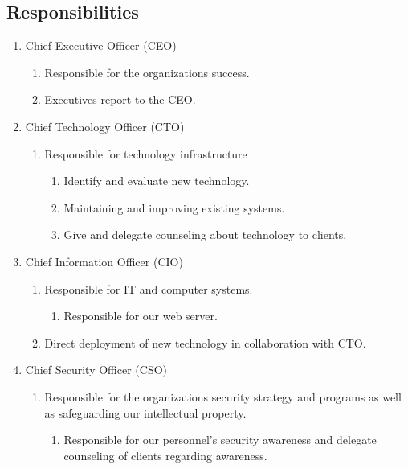 \subsection{Responsibilities}

\begin{enumerate}
  \item Chief Executive Officer (CEO)
   \begin{enumerate}
      \item Responsible for the organizations success.
      \item Executives report to the CEO.
  \end{enumerate}
  \item Chief Technology Officer (CTO)
   \begin{enumerate}
      \item Responsible for technology infrastructure
      \begin{enumerate}
        \item Identify and evaluate new technology.
        \item Maintaining and improving existing systems.
        \item Give and delegate counseling about technology to clients.
      \end{enumerate}
  \end{enumerate}
  \item Chief Information Officer (CIO)
   \begin{enumerate}
      \item Responsible for IT and computer systems.
      \begin{enumerate}
          \item Responsible for our web server.
      \end{enumerate}
      \item Direct deployment of new technology in collaboration with CTO.
  \end{enumerate}
  \item Chief Security Officer (CSO)
   \begin{enumerate}
      \item Responsible for the organizations security strategy and programs as well as safeguarding our intellectual property.
      \begin{enumerate}
          \item Responsible for our personnel's security awareness and delegate counseling of clients regarding awareness.
      \end{enumerate}
  \end{enumerate}

\end{enumerate}
